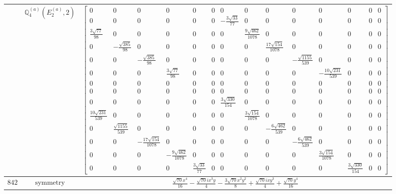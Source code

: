 \documentclass[fleqn,8pt,landscape]{jsarticle}
\begin{document}
\begin{longtable}{ccc}
$  $ & $ \mathbb{Q}_{4}^{(a)}(E_{2}^{(a)},2) $ & $ \begin{bmatrix} 0 & 0 & 0 & 0 & 0 & 0 & 0 & 0 & 0 & 0 & 0 & 0 & 0 & 0 \\ 0 & 0 & 0 & 0 & 0 & 0 & - \frac{3 \sqrt{33}}{77} & 0 & 0 & 0 & 0 & 0 & 0 & 0 \\ \frac{3 \sqrt{77}}{98} & 0 & 0 & 0 & 0 & 0 & 0 & \frac{9 \sqrt{462}}{1078} & 0 & 0 & 0 & 0 & 0 & 0 \\ 0 & - \frac{\sqrt{385}}{98} & 0 & 0 & 0 & 0 & 0 & 0 & \frac{17 \sqrt{154}}{1078} & 0 & 0 & 0 & 0 & 0 \\ 0 & 0 & - \frac{\sqrt{385}}{98} & 0 & 0 & 0 & 0 & 0 & 0 & - \frac{\sqrt{1155}}{539} & 0 & 0 & 0 & 0 \\ 0 & 0 & 0 & \frac{3 \sqrt{77}}{98} & 0 & 0 & 0 & 0 & 0 & 0 & - \frac{10 \sqrt{231}}{539} & 0 & 0 & 0 \\ 0 & 0 & 0 & 0 & 0 & 0 & 0 & 0 & 0 & 0 & 0 & 0 & 0 & 0 \\ 0 & 0 & 0 & 0 & 0 & 0 & 0 & 0 & 0 & 0 & 0 & 0 & 0 & 0 \\ 0 & 0 & 0 & 0 & 0 & 0 & \frac{3 \sqrt{330}}{154} & 0 & 0 & 0 & 0 & 0 & 0 & 0 \\ \frac{10 \sqrt{231}}{539} & 0 & 0 & 0 & 0 & 0 & 0 & \frac{3 \sqrt{154}}{1078} & 0 & 0 & 0 & 0 & 0 & 0 \\ 0 & \frac{\sqrt{1155}}{539} & 0 & 0 & 0 & 0 & 0 & 0 & - \frac{6 \sqrt{462}}{539} & 0 & 0 & 0 & 0 & 0 \\ 0 & 0 & - \frac{17 \sqrt{154}}{1078} & 0 & 0 & 0 & 0 & 0 & 0 & - \frac{6 \sqrt{462}}{539} & 0 & 0 & 0 & 0 \\ 0 & 0 & 0 & - \frac{9 \sqrt{462}}{1078} & 0 & 0 & 0 & 0 & 0 & 0 & \frac{3 \sqrt{154}}{1078} & 0 & 0 & 0 \\ 0 & 0 & 0 & 0 & \frac{3 \sqrt{33}}{77} & 0 & 0 & 0 & 0 & 0 & 0 & \frac{3 \sqrt{330}}{154} & 0 & 0 \end{bmatrix} $ \\ \hline
$ 842 $ & $ \text{symmetry} $ & $ \frac{\sqrt{70} x^{4}}{16} - \frac{\sqrt{70} i x^{3} y}{4} - \frac{3 \sqrt{70} x^{2} y^{2}}{8} + \frac{\sqrt{70} i x y^{3}}{4} + \frac{\sqrt{70} y^{4}}{16} $ \\

\end{longtable}
\end{document}
